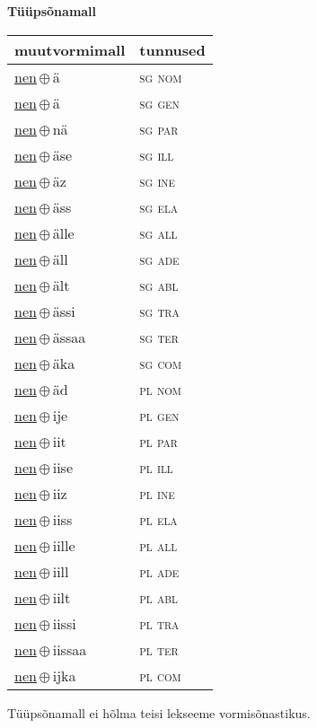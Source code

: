 

\vspace{3.5em}
\noindent \begin{minipage}{\textwidth}
\noindent \textbf{Tüüpsõnamall \,}\\

\begin{sideways}
\begin{tabular}{l l}
muutvormimall & tunnused \\
\hline
\underline{nen}\,$\oplus$\,ä & \textsc{ sg nom } \\
\underline{nen}\,$\oplus$\,ä & \textsc{ sg gen } \\
\underline{nen}\,$\oplus$\,nä & \textsc{ sg par } \\
\underline{nen}\,$\oplus$\,äse & \textsc{ sg ill } \\
\underline{nen}\,$\oplus$\,äz & \textsc{ sg ine } \\
\underline{nen}\,$\oplus$\,äss & \textsc{ sg ela } \\
\underline{nen}\,$\oplus$\,älle & \textsc{ sg all } \\
\underline{nen}\,$\oplus$\,äll & \textsc{ sg ade } \\
\underline{nen}\,$\oplus$\,ält & \textsc{ sg abl } \\
\underline{nen}\,$\oplus$\,ässi & \textsc{ sg tra } \\
\underline{nen}\,$\oplus$\,ässaa & \textsc{ sg ter } \\
\underline{nen}\,$\oplus$\,äka & \textsc{ sg com } \\
\underline{nen}\,$\oplus$\,äd & \textsc{ pl nom } \\
\underline{nen}\,$\oplus$\,ije & \textsc{ pl gen } \\
\underline{nen}\,$\oplus$\,iit & \textsc{ pl par } \\
\underline{nen}\,$\oplus$\,iise & \textsc{ pl ill } \\
\underline{nen}\,$\oplus$\,iiz & \textsc{ pl ine } \\
\underline{nen}\,$\oplus$\,iiss & \textsc{ pl ela } \\
\underline{nen}\,$\oplus$\,iille & \textsc{ pl all } \\
\underline{nen}\,$\oplus$\,iill & \textsc{ pl ade } \\
\underline{nen}\,$\oplus$\,iilt & \textsc{ pl abl } \\
\underline{nen}\,$\oplus$\,iissi & \textsc{ pl tra } \\
\underline{nen}\,$\oplus$\,iissaa & \textsc{ pl ter } \\
\underline{nen}\,$\oplus$\,ijka & \textsc{ pl com } \\
\end{tabular}
\end{sideways}
\label{tab:tüüpsõnamall-nenä}

\end{minipage}

 
\vspace{1em}
\noindent Tüüpsõnamall  ei hõlma teisi lekseeme vormi\-sõnastikus.
